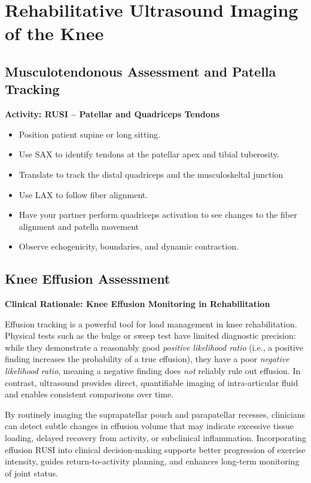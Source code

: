 \section*{Rehabilitative Ultrasound Imaging of the Knee}

\subsection*{Musculotendonous Assessment and Patella Tracking}

\begin{labactivitybox}
\textbf{Activity: RUSI -- Patellar and Quadriceps Tendons}
\begin{itemize}
  \item Position patient supine or long sitting.
  \item Use SAX to identify tendons at the patellar apex and tibial tuberosity.
  \item Translate to track the distal quadriceps and the musculoskeltal junction
  \item Use LAX to follow fiber alignment.
  \item Have your partner perform quadriceps activation to see changes to the fiber alignment and patella movement
  \item Observe echogenicity, boundaries, and dynamic contraction.
\end{itemize}
\end{labactivitybox}

\subsection*{Knee Effusion Assessment}
\noindent
\textbf{Clinical Rationale: Knee Effusion Monitoring in Rehabilitation}

Effusion tracking is a powerful tool for load management in knee rehabilitation. Physical tests such as the bulge or sweep test have limited diagnostic precision: while they demonstrate a reasonably good \textit{positive likelihood ratio} (i.e., a positive finding increases the probability of a true effusion), they have a poor \textit{negative likelihood ratio}, meaning a negative finding does \textit{not} reliably rule out effusion. In contrast, ultrasound provides direct, quantifiable imaging of intra-articular fluid and enables consistent comparisons over time.

By routinely imaging the suprapatellar pouch and parapatellar recesses, clinicians can detect subtle changes in effusion volume that may indicate excessive tissue loading, delayed recovery from activity, or subclinical inflammation. Incorporating effusion RUSI into clinical decision-making supports better progression of exercise intensity, guides return-to-activity planning, and enhances long-term monitoring of joint status.
\vspace{0.5cm}

